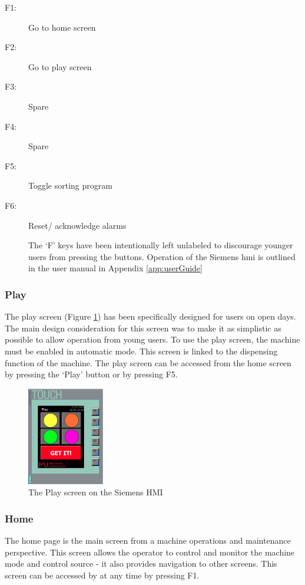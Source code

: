         \begin{description}

        \item[F1:] Go to home screen
        \item[F2:] Go to play screen
        \item[F3:] Spare 
        \item[F4:] Spare
        \item[F5:] Toggle sorting program
        \item[F6:] Reset/ acknowledge alarms
        
        The `F' keys have been intentionally left unlabeled to discourage younger users from pressing the buttons. 
        Operation of the Siemens \acrshort{hmi} is outlined in the user manual in Appendix \ref{app:userGuide}
        
        \end{description}

        \subsubsection{Play}
        The play screen (Figure \ref{fig:hmiPlay}) has been specifically designed for users on open days. The main design consideration for this screen was to make it as simplistic as possible to allow operation from young users. 
        To use the play screen, the machine must be enabled in automatic mode. This screen is linked to the dispensing function of the machine.  The play screen can be accessed from the home screen by pressing the `Play' button or by pressing F5. 
        
        \begin{figure}[H]
            \centering
            \includegraphics[width = 0.3\textwidth]{2_images/hmiPlay}
            \caption{The Play screen on the Siemens HMI}
            \label{fig:hmiPlay}
        \end{figure} 

        \subsubsection{Home}
            The home page is the main screen from a machine operations and maintenance perspective. This screen allows the operator to control and monitor the machine mode and control source - it also provides navigation to other screens. This screen can be accessed by at any time by pressing F1.  
        
